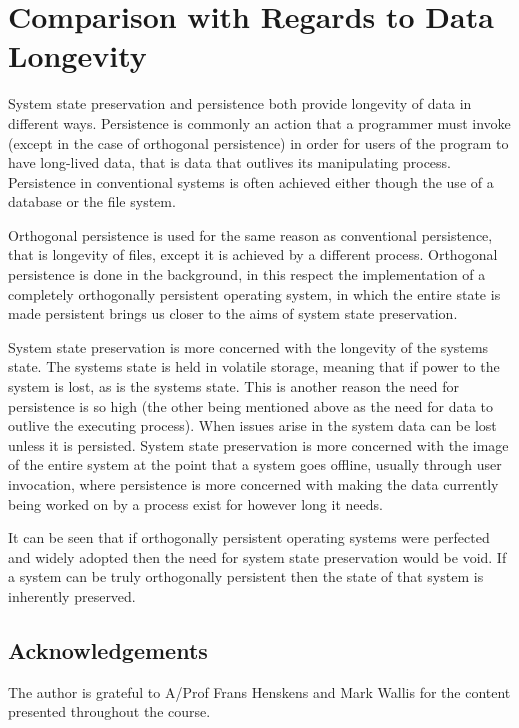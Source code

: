 \documentclass[a4paper,12pt]{article}
\begin{document}
\section{Comparison with Regards to Data Longevity}\label{sec:discussion}
System state preservation and persistence both provide longevity of data in different ways. Persistence is commonly an action that a programmer must invoke (except in the case of orthogonal persistence) in order for users of the program to have long-lived data, that is data that outlives its manipulating process. Persistence in conventional systems is often achieved either though the use of a database or the file system.
\par
Orthogonal persistence is used for the same reason as conventional persistence, that is longevity of files, except it is achieved by a different process. Orthogonal persistence is done in the background, in this respect the implementation of a completely orthogonally persistent operating system, in which the entire state is made persistent brings us closer to the aims of system state preservation.
\par
System state preservation is more concerned with the longevity of the systems state. The systems state is held in volatile storage, meaning that if power to the system is lost, as is the systems state. This is another reason the need for persistence is so high (the other being mentioned above as the need for data to outlive the executing process). When issues arise in the system data can be lost unless it is persisted.
System state preservation is more concerned with the image of the entire system at the point that a system goes offline, usually through user invocation, where persistence is more concerned with making the data currently being worked on by a process exist for however long it needs.
\par
It can be seen that if orthogonally persistent operating systems were perfected and widely adopted then the need for system state preservation would be void. If a system can be truly orthogonally persistent then the state of that system is inherently preserved.
%
\subsection*{Acknowledgements}
The author is grateful to A/Prof Frans Henskens and Mark Wallis for the content presented throughout the course.
\newpage

%

\vskip 0.2in
\newpage


\end{document}
